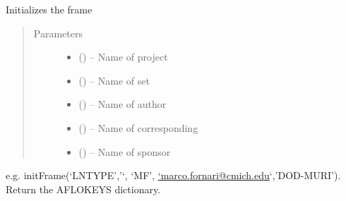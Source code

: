 \documentclass[letterpaper,10pt,english]{sphinxmanual}
\begin{document}
\begin{fulllineitems}
\label{\detokenize{prep:prep.init__}}
Initializes the frame
\begin{quote}\begin{description}
\item[{Parameters}] \leavevmode\begin{itemize}
\item {} 
 () -- Name of project

\item {} 
 () -- Name of set

\item {} 
 () -- Name of author

\item {} 
 () -- Name of corresponding

\item {} 
 () -- Name of sponsor

\end{itemize}

\end{description}\end{quote}

e.g. initFrame(`LNTYPE','`, `MF', \href{mailto:'marco.fornari@cmich.edu}{`marco.fornari@cmich.edu}`,'DOD-MURI'). Return the AFLOKEYS dictionary.

\end{fulllineitems}

\end{document}
